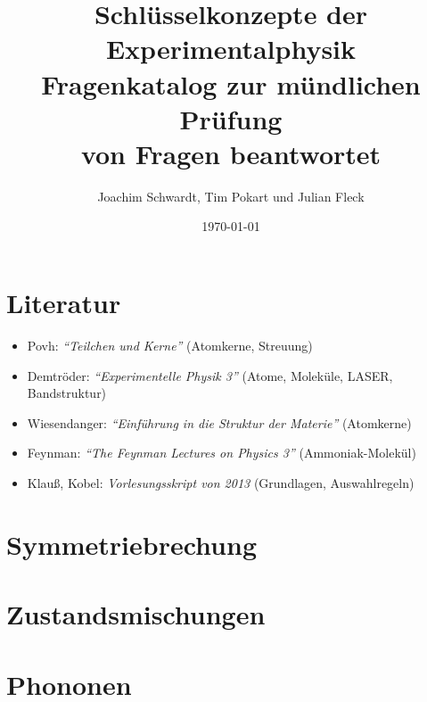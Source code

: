 \documentclass[]{scrartcl}
\title{Schlüsselkonzepte der Experimentalphysik\\Fragenkatalog zur mündlichen Prüfung\\\vspace{.4em}\small{
\total{questionsansweredtotal} von \total{questionstotal} Fragen beantwortet}}
\author{Joachim Schwardt, Tim Pokart und Julian Fleck }
\date{\today}
\newcounter{question}
\numberwithin{question}{section}
\numberwithin{figure}{section}
\numberwithin{table}{section}
\begin{document}
\maketitle
\tableofcontents

\clearpage
{}
{}
\listofquestions

\cleardoublepage
\section*{Literatur}
\label{sec:literatur}

\begin{itemize}
    \item Povh: \textit{``Teilchen und Kerne''} (Atomkerne, Streuung)
    \item Demtröder: \textit{``Experimentelle Physik 3''} (Atome, Moleküle, LASER, Bandstruktur)
    \item Wiesendanger: \textit{``Einführung in die Struktur der Materie''} (Atomkerne)
    \item Feynman: \textit{``The Feynman Lectures on Physics 3''} (Ammoniak-Molekül)
    \item Klauß, Kobel: \textit{Vorlesungsskript von  2013} (Grundlagen, Auswahlregeln)
\end{itemize}

\cleardoublepage
\section{Symmetriebrechung}


\cleardoublepage
\section{Zustandsmischungen}


\section{Phononen}

\end{document}
